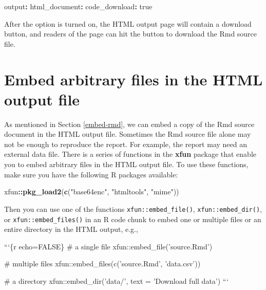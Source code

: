 \documentclass[
  11pt,
]{krantz}
\newenvironment{Shaded}{\begin{snugshade}}{\end{snugshade}}
\newcommand{\AttributeTok}[1]{\textcolor[rgb]{0.61,0.61,0.61}{#1}}
\newcommand{\BaseNTok}[1]{\textcolor[rgb]{0.06,0.06,0.06}{#1}}
\newcommand{\CharTok}[1]{\textcolor[rgb]{0.5,0.5,0.5}{#1}}
\newcommand{\FunctionTok}[1]{\textcolor[rgb]{0,0,0}{#1}}
\newcommand{\KeywordTok}[1]{\textcolor[rgb]{0.27,0.27,0.27}{\textbf{#1}}}
\newcommand{\NormalTok}[1]{#1}
\newcommand{\OperatorTok}[1]{\textcolor[rgb]{0.43,0.43,0.43}{\textbf{#1}}}
\newcommand{\StringTok}[1]{\textcolor[rgb]{0.5,0.5,0.5}{#1}}
\begin{document}
\begin{Shaded}
\begin{Highlighting}[]
\FunctionTok{output}\KeywordTok{:}
\AttributeTok{  }\FunctionTok{html_document}\KeywordTok{:}
\AttributeTok{    }\FunctionTok{code_download}\KeywordTok{:}\AttributeTok{ }\CharTok{true}
\end{Highlighting}
\end{Shaded}

After the option is turned on, the HTML output page will contain a download button, and readers of the page can hit the button to download the Rmd source file.

\hypertarget{embed-file}{%
\section{Embed arbitrary files in the HTML output file}\label{embed-file}}

As mentioned in Section \ref{embed-rmd}, we can embed a copy of the Rmd source document in the HTML output file. Sometimes the Rmd source file alone may not be enough to reproduce the report. For example, the report may need an external data file. There is a series of functions in the \textbf{xfun} package that enable you to embed arbitrary files in the HTML output file. To use these functions, make sure you have the following R packages available:

\begin{Shaded}
\begin{Highlighting}[]
\NormalTok{xfun}\OperatorTok{::}\KeywordTok{pkg_load2}\NormalTok{(}\KeywordTok{c}\NormalTok{(}\StringTok{"base64enc"}\NormalTok{, }\StringTok{"htmltools"}\NormalTok{, }\StringTok{"mime"}\NormalTok{))}
\end{Highlighting}
\end{Shaded}

Then you can use one of the functions \texttt{xfun::embed\_file()}, \texttt{xfun::embed\_dir()}, or \texttt{xfun::embed\_files()} in an R code chunk to embed one or multiple files or an entire directory in the HTML output, e.g.,

\begin{Shaded}
\begin{Highlighting}[]
\BaseNTok{```\{r echo=FALSE\}}
\BaseNTok{# a single file}
\BaseNTok{xfun::embed_file('source.Rmd')}

\BaseNTok{# multiple files}
\BaseNTok{xfun::embed_files(c('source.Rmd', 'data.csv'))}

\BaseNTok{# a directory}
\BaseNTok{xfun::embed_dir('data/', text = 'Download full data')}
\BaseNTok{```}
\end{Highlighting}
\end{Shaded}
\end{document}
